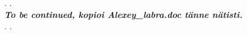 \documentclass[fleqn,10pt]{SelfArx} %
\begin{document}




%
%
%
%



.
\vspace{10mm}
.\\
\textbf{
\emph{To be continued, kopioi Alexey\_labra.doc tänne nätisti.
}}\\
.
\vspace{10mm}
.
\end{document}
